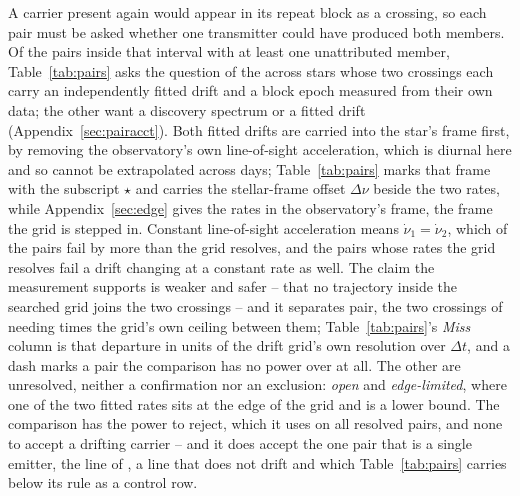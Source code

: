 A carrier present again would appear in its repeat block as a crossing,
so each pair must be asked whether one transmitter could have produced both
members. Of the \TjNCandPair{} pairs inside that interval with at least one
unattributed member, Table~\ref{tab:pairs} asks the question of the \TjNPair{}
across \TjNStarPair{} stars whose two crossings each carry an independently
fitted drift and a block epoch measured from their own data; the other
\TjNCandLost{} want a discovery spectrum or a fitted drift
(Appendix~\ref{sec:pairacct}). Both fitted drifts are carried into the star's
frame first, by removing the observatory's own line-of-sight acceleration,
which is diurnal here and so cannot be extrapolated across days;
Table~\ref{tab:pairs} marks that frame with the subscript $\star$ and carries
the stellar-frame offset $\Delta\nu$ beside the two rates, while
Appendix~\ref{sec:edge} gives the rates in the observatory's frame, the frame
the grid is stepped in. Constant line-of-sight acceleration means
$\dot\nu_1=\dot\nu_2$, which \TjNUneqDrift{} of the \TjNPair{} pairs fail by
more than the grid resolves, and the \TjNPower{} pairs whose rates the grid
resolves fail a drift changing at a constant rate as well. The claim the
measurement supports is weaker and safer -- that no trajectory inside the
searched grid joins the two crossings -- and it separates \TjNExcl{} pair, the
two crossings of \EcGridStar{} needing \EcGridFactor{} times the grid's own
ceiling between them; Table~\ref{tab:pairs}'s \emph{Miss} column is that
departure in units of the drift grid's own resolution over $\Delta t$, and a
dash marks a pair the comparison has no power over at all. The other
\TjNOpen{} are unresolved, neither a confirmation nor an exclusion:
\TjNOpenPlain{} \emph{open} and \TjNPairEdge{} \emph{edge-limited}, where one
of the two fitted rates sits at the edge of the grid and is a lower bound. The
comparison has the power to reject, which it uses on all \TjNPower{} resolved
pairs, and none to accept a drifting carrier -- and it does accept the one pair
that is a single emitter, the \TjCtlLine{} line of \TjCtlStar, a line that does
not drift and which Table~\ref{tab:pairs} carries below its rule as a control
row.

